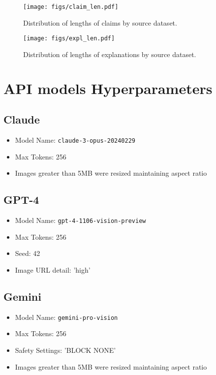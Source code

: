 \begin{figure}[htbp]
    \centering
    \texttt{[image: figs/claim\_len.pdf]}
    \caption{Distribution of lengths of claims by source dataset.}
    \label{fig:claimLen}
\end{figure}

\begin{figure}[htbp]
    \centering
    \texttt{[image: figs/expl\_len.pdf]}
    \caption{Distribution of lengths of explanations by source dataset.}
    \label{fig:explLen}
\end{figure}
\section{API models Hyperparameters} \label{app:api-hyper}
\subsection{Claude}
\begin{itemize}
    \item Model Name: \texttt{claude-3-opus-20240229}
    \item Max Tokens: 256
    \item Images greater than 5MB were resized maintaining aspect ratio
\end{itemize}

\subsection{GPT-4}
\begin{itemize}
    \item Model Name: \texttt{gpt-4-1106-vision-preview}
    \item Max Tokens: 256
    \item Seed: 42
    \item Image URL detail: 'high'
\end{itemize}

\subsection{Gemini}
\begin{itemize}
    \item Model Name: \texttt{gemini-pro-vision}
    \item Max Tokens: 256
    \item Safety Settings: 'BLOCK NONE'
    \item Images greater than 5MB were resized maintaining aspect ratio
\end{itemize}


